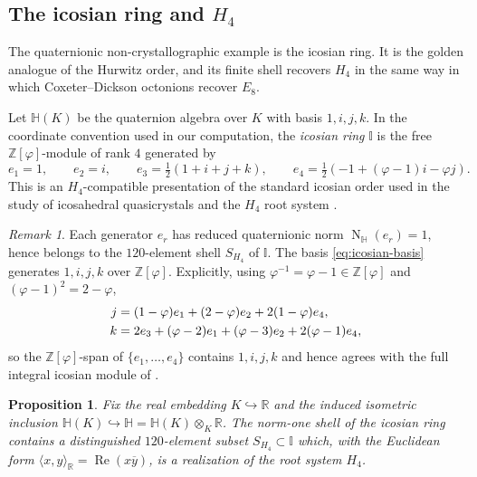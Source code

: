 \documentclass[12pt,oneside,english]{amsart}
\numberwithin{equation}{section}
\numberwithin{figure}{section}
\numberwithin{table}{section}
\theoremstyle{plain}
\newtheorem{proposition}[theorem]{Proposition}
\theoremstyle{definition}
\theoremstyle{remark}
\newtheorem{remark}[theorem]{Remark}
\newcommand{\RR}{\mathbb R}
\newcommand{\HH}{\mathbb H}
\newcommand{\Zphi}{\mathbb Z[\varphi]}
\newcommand{\Norm}{\operatorname{N}}
\newcommand{\Rea}{\operatorname{Re}}
\begin{document}
\subsection{The icosian ring and \texorpdfstring{\(H_4\)}{H4}}

The quaternionic non-crystallographic example is the icosian ring. It is the golden analogue of the Hurwitz order, and its finite shell recovers \(H_4\) in the same way in which Coxeter--Dickson octonions recover \(E_8\).

Let \(\HH(K)\) be the quaternion algebra over \(K\) with basis \(1,i,j,k\). In the coordinate convention used in our computation, the \emph{icosian ring} \(\mathbb I\) is the free \(\Zphi\)-module of rank \(4\) generated by
\begin{equation}
e_1=1,\qquad e_2=i,\qquad e_3=\tfrac12(1+i+j+k),\qquad e_4=\tfrac12(-1+(\varphi-1)i-\varphi j).
\label{eq:icosian-basis}
\end{equation}
This is an \(H_4\)-compatible presentation of the standard icosian order \cite[Ch.~8 \S2]{Conway} used in the study of icosahedral quasicrystals \cite{Icosians} and the \(H_4\) root system \cite{Ti80}.

\begin{remark}
\label{rem:icosian-basis-generates-jk}
Each generator \(e_{r}\) has reduced quaternionic norm \(\Norm_{\HH}(e_{r})=1\), hence belongs to the \(120\)-element shell \(S_{H_{4}}\) of \(\mathbb I\). The basis \eqref{eq:icosian-basis} generates \(1,i,j,k\) over \(\Zphi\). Explicitly, using \(\varphi^{-1}=\varphi-1\in\Zphi\) and \((\varphi-1)^2=2-\varphi\),
\begin{align}
j&=(1-\varphi)e_1+(2-\varphi)e_2+2(1-\varphi)e_4, \notag\\
k&=2e_3+(\varphi-2)e_1+(\varphi-3)e_2+2(\varphi-1)e_4, \label{eq:icosian-jk-expressions}
\end{align}
so the \(\Zphi\)-span of \(\{e_1,\ldots,e_4\}\) contains \(1,i,j,k\) and hence agrees with the full integral icosian module of \cite[Ch.~8 \S2.1]{Conway}.
\end{remark}

\begin{proposition}
\label{prop:icosian-h4}
Fix the real embedding \(K\hookrightarrow\RR\) and the induced isometric inclusion \(\HH(K)\hookrightarrow\HH=\HH(K)\otimes_K\RR\). The norm-one shell of the icosian ring contains a distinguished \(120\)-element subset \(S_{H_4}\subset\mathbb I\) which, with the Euclidean form \(\langle x,y\rangle_{\RR}=\Rea(x\overline{y})\), is a realization of the root system \(H_4\).
\end{proposition}
\end{document}
